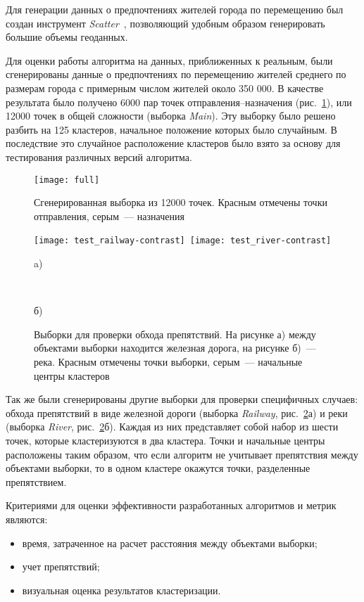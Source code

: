 Для генерации данных о предпочтениях жителей города по перемещению был создан инструмент \emph{Scatter}~\cite{scatter}, позволяющий удобным образом генерировать большие объемы геоданных.

Для оценки работы алгоритма на данных, приближенных к реальным, были сгенерированы данные о предпочтениях по перемещению жителей среднего по размерам города с примерным числом жителей около 350 000. В качестве результата было получено 6000 пар точек отправления--назначения (рис.~\ref{pic:full}), или 12000 точек в общей сложности (выборка \emph{Main}). Эту выборку было решено разбить на 125 кластеров, начальное положение которых было случайным. В последствие это случайное расположение кластеров было взято за основу для тестирования различных версий алгоритма.

\begin{figure}[ht!]
    \centering
    \texttt{[image: full]} \\[1ex]
    \parbox{.9\textwidth}{\caption{Сгенерированная выборка из 12000 точек. Красным отмечены точки отправления, серым~--- назначения} \label{pic:full}}
    \vspace*{-1ex}
\end{figure}

\begin{figure}[b!]
    \centering
    \texttt{[image: test\_railway-contrast]}\
    \texttt{[image: test\_river-contrast]} \\
    \parbox{.47\textwidth}{\small\centering a)}\ \parbox{.47\textwidth}{\small\centering б)}
    \parbox{.9\textwidth}{\caption{Выборки для проверки обхода препятствий. На рисунке а) между объектами выборки находится железная дорога, на рисунке б)~--- река. Красным отмечены точки выборки, серым~--- начальные центры кластеров} \label{pic:railway-river}}
    \vspace*{-1ex}
\end{figure}

Так же были сгенерированы другие выборки для проверки специфичных случаев: обхода препятствий в виде железной дороги (выборка \emph{Railway}, рис.~\ref{pic:railway-river}а) и реки (выборка \emph{River}, рис.~\ref{pic:railway-river}б). Каждая из них представляет собой набор из шести точек, которые кластеризуются в два кластера. Точки и начальные центры расположены таким образом, что если алгоритм не учитывает препятствия между объектами выборки, то в одном кластере окажутся точки, разделенные препятствием.

Критериями для оценки эффективности разработанных алгоритмов и метрик являются:
\begin{itemize}
    \item время, затраченное на расчет расстояния между объектами выборки;
    \item учет препятствий;
    \item визуальная оценка результатов кластеризации.
\end{itemize}
